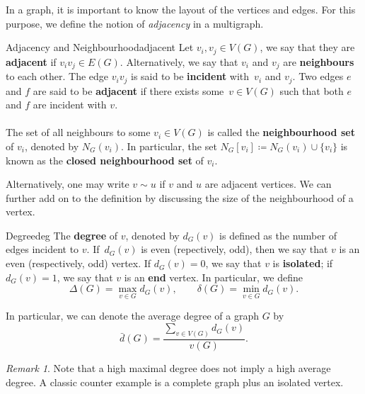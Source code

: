 \documentclass[math, code]{amznotes}
\theoremstyle{remark}
\newtheorem*{remark}{Remark}
\begin{document}
In a graph, it is important to know the layout of the vertices and edges. For this purpose, we define the notion of \textit{adjacency} in a multigraph.
\begin{dfnbox}{Adjacency and Neighbourhood}{adjacent}
    Let $v_i, v_j \in V(G)$, we say that they are {\color{red} \textbf{adjacent}} if $v_iv_j \in E(G)$. Alternatively, we say that $v_i$ and $v_j$ are {\color{red} \textbf{neighbours}} to each other. The edge $v_iv_j$ is said to be {\color{red} \textbf{incident}} with~$v_i$ and $v_j$. Two edges $e$ and $f$ are said to be {\color{red} \textbf{adjacent}} if there exists some~$v \in V(G)$ such that both $e$ and $f$ are incident with $v$. 
    \\\\
    The set of all neighbours to some $v_i \in V(G)$ is called the {\color{red} \textbf{neighbourhood set}} of $v_i$, denoted by $N_G(v_i)$. In particular, the set $N_G[v_i] \coloneqq N_G(v_i)\cup\{v_i\}$ is known as the {\color{red} \textbf{closed neighbourhood set}} of $v_i$.
\end{dfnbox}
Alternatively, one may write $v \sim u$ if $v$ and $u$ are adjacent vertices. We can further add on to the definition by discussing the size of the neighbourhood of a vertex.
\begin{dfnbox}{Degree}{deg}
    The {\color{red} \textbf{degree}} of $v$, denoted by $d_G(v)$ is defined as the number of edges incident to $v$. If~$d_G(v)$ is even (repectively, odd), then we say that $v$ is an even (respectively, odd) vertex. If $d_G(v) = 0$, we say that $v$ is {\color{red} \textbf{isolated}}; if $d_G(v) = 1$, we say that $v$ is an {\color{red} \textbf{end}} vertex. In particular, we define
    \begin{equation*}
        \Delta(G) = \max_{v \in G}d_G(v), \qquad \delta(G) = \min_{v \in G}d_G(v).
    \end{equation*}
\end{dfnbox}
In particular, we can denote the average degree of a graph $G$ by
\begin{equation*}
    \bar{d}(G) = \frac{\sum_{v \in V(G)}d_G(v)}{v(G)}.
\end{equation*}
\begin{notebox}
    \begin{remark}
        Note that a high maximal degree does not imply a high average degree. A classic counter example is a complete graph plus an isolated vertex.
    \end{remark}
\end{notebox}
\end{document}
